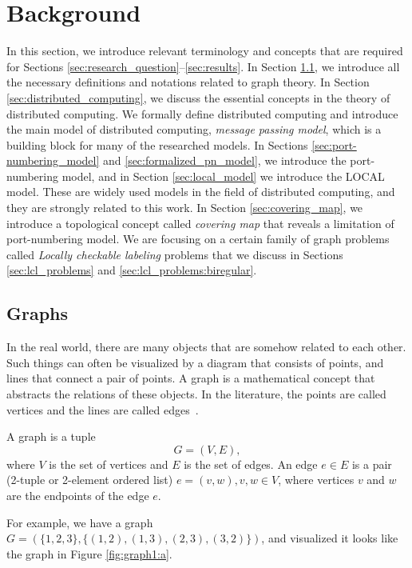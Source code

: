 
\section{Background} \label{sec:background}
In this section, we introduce relevant terminology and concepts that are required for Sections \ref{sec:research_question}--\ref{sec:results}.
%
In Section \ref{sec:graphs}, we introduce all the necessary definitions and notations related to graph theory.
%
In Section \ref{sec:distributed_computing}, we discuss the essential concepts in the theory of distributed computing.
We formally define distributed computing and introduce the main model of distributed computing, \emph{message passing model}, which is a building block for many of the researched models.
%
In Sections \ref{sec:port-numbering_model} and \ref{sec:formalized_pn_model}, we introduce the port-numbering model, and in Section \ref{sec:local_model} we introduce the LOCAL model.
These are widely used models in the field of distributed computing, and they are strongly related to this work.
%
In Section \ref{sec:covering_map}, we introduce a topological concept called \emph{covering map} that reveals a limitation of port-numbering model.
%
We are focusing on a certain family of graph problems called \emph{Locally checkable labeling} problems that we discuss in Sections \ref{sec:lcl_problems} and \ref{sec:lcl_problems:biregular}.


\subsection{Graphs} \label{sec:graphs}
In the real world, there are many objects that are somehow related to each other.
Such things can often be visualized by a diagram that consists of points, and lines that connect a pair of points.
A graph is a mathematical concept that abstracts the relations of these objects.
In the literature, the points are called vertices and the lines are called edges~\cite{DBLP:books/others/BondyM76}.

\begin{definition}
A graph is a tuple \[  G = (V, E), \] where $V$ is the set of vertices and $E$ is the set of edges.
An edge $e \in E$ is a pair (2-tuple or 2-element ordered list) $e=(v, w), v, w \in V$, where vertices $v$ and $w$ are the endpoints of the edge $e$.
\end{definition}
For example, we have a graph $G=(\{1, 2, 3\}, \{(1, 2),(1, 3),(2, 3),(3, 2)\})$, and visualized it looks like the graph in Figure \ref{fig:graph1:a}.

